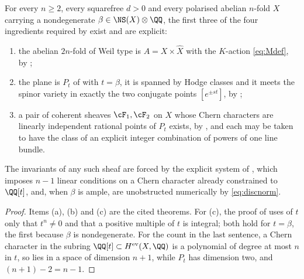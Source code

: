 \begin{theorem}\label{thm:twoofthefour}
For every $n\ge2$, every squarefree $d>0$ and every polarised abelian $n$-fold
$X$ carrying a nondegenerate $\beta\in\NS(X)\otimes\QQ$, the first three of the
four ingredients required by  exist and are explicit:
\begin{enumerate}[label=\textup{(\alph*)}]
\item the abelian $2n$-fold of Weil type is $A=X\times\widehat{X}$ with the
  $K$-action \eqref{eq:Mdef}, by ;
\item the plane is $P_{t}$ of  with $t=\beta$, it is
  spanned by Hodge classes and it meets the spinor variety in exactly the two
  conjugate points $[e^{\pm st}]$, by ;
\item a pair of coherent sheaves $\cF_{1},\cF_{2}$ on $X$ whose Chern
  characters are linearly independent rational points of $P_{t}$ exists, by
  , and each may be taken to have the class of an
  explicit integer combination of powers of one line bundle.
\end{enumerate}
The invariants of any such sheaf are forced by the explicit system of
, which imposes $n-1$ linear conditions on a Chern
character already constrained to $\QQ[t]$, and, when $\beta$ is ample, are
unobstructed numerically by \eqref{eq:discnorm}.
\end{theorem}

\begin{proof}
Items (a), (b) and (c) are the cited theorems. For (c), the proof of
 uses of $t$ only that $t^{n}\ne0$ and that a positive
multiple of $t$ is integral; both hold for $t=\beta$, the first because
$\beta$ is nondegenerate. For the count in the last sentence, a Chern
character in the subring $\QQ[t]\subset H^{\mathrm{ev}}(X,\QQ)$ is a
polynomial of degree at most $n$ in $t$, so lies in a space of dimension
$n+1$, while $P_{t}$ has dimension two, and $(n+1)-2=n-1$.
\end{proof}

